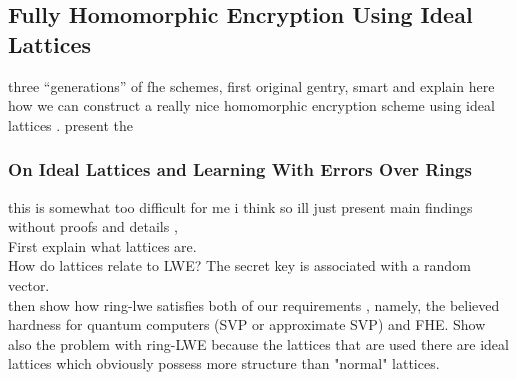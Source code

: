 \subsection{Fully Homomorphic Encryption Using Ideal Lattices}
three ``generations'' of fhe schemes, first original gentry, smart and
explain here how we can construct a really nice homomorphic encryption scheme using ideal lattices \cite{gentry}. present the 
\subsubsection*{On Ideal Lattices and Learning With Errors Over Rings}
this is somewhat too difficult for me i think so ill just present main findings without proofs and details \cite{regev}, \\
First explain what lattices are. \\
How do lattices relate to LWE? The secret key is associated with a random vector. \\
then show how ring-lwe satisfies both of our requirements \cite{ring-lwe}, namely, the believed hardness for quantum computers (SVP or approximate SVP) and FHE. Show also the problem with ring-LWE because the lattices that are used there are ideal lattices which obviously possess more structure than "normal" lattices.
